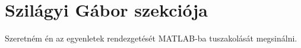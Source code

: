\section{Szilágyi Gábor szekciója}
Szeretném én az egyenletek rendezgetését MATLAB-ba tuszakolását megsinálni.


